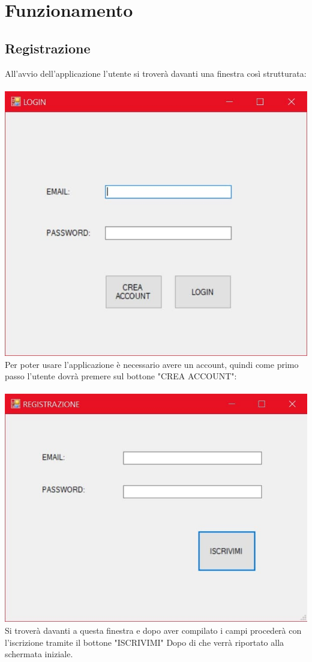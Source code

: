 \documentclass[a4paper, titlepage]{article}
\begin{document}
\section{Funzionamento}
\subsection{Registrazione}
All'avvio dell'applicazione l'utente si troverà davanti una finestra così strutturata:\\\\
\includegraphics[scale=0.30]{Immagini/form/Form Login.jpg}
\\Per poter usare l'applicazione è necessario avere un account, quindi come primo passo l'utente dovrà premere sul bottone "CREA ACCOUNT":\\\\
\includegraphics[scale=0.30]{Immagini/form/Form Registrazione.jpg}
\\Si troverà davanti a questa finestra e dopo aver compilato i campi procederà con l'iscrizione tramite il bottone "ISCRIVIMI"
Dopo di che verrà riportato alla schermata iniziale.
\newpage
\end{document}

